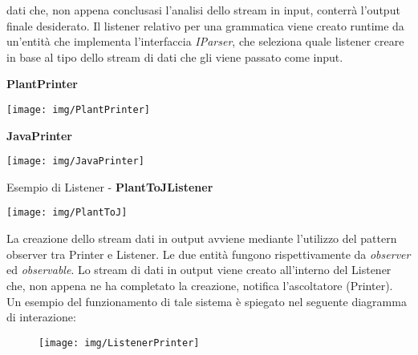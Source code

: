\documentclass{article}
\begin{document}
  dati che, non appena conclusasi l'analisi dello stream in input, conterrà l'output finale desiderato. Il listener relativo per una grammatica viene creato runtime
  da un'entità che implementa l'interfaccia \textit{IParser}, che seleziona quale listener creare in base al tipo dello stream di dati che gli viene passato
  come input.
  \begin{center}
    \begin{framed}
      \textbf{PlantPrinter}\par\medskip
      \texttt{[image: img/PlantPrinter]}
    \end{framed}
  \end{center}
  \begin{center}
    \begin{framed}
      \textbf{JavaPrinter}\par\medskip
      \texttt{[image: img/JavaPrinter]}
    \end{framed}
  \end{center}
  \begin{center}
    \begin{framed}
      Esempio di Listener - \textbf{PlantToJListener}\par\medskip
      \texttt{[image: img/PlantToJ]}
    \end{framed}
  \end{center}
  La creazione dello stream dati in output avviene mediante l'utilizzo del pattern observer tra Printer e Listener. Le due entità fungono rispettivamente da
  \textit{observer} ed \textit{observable}. Lo stream di dati in output viene creato all'interno del Listener che, non appena ne ha completato la creazione,
  notifica l'ascoltatore (Printer).\\
  Un esempio del funzionamento di tale sistema è spiegato nel seguente diagramma di interazione:
  \begin{figure}[H]
    \begin{framed}
      \centering
      \texttt{[image: img/ListenerPrinter]}
    \end{framed}
  \end{figure}
\end{document}
